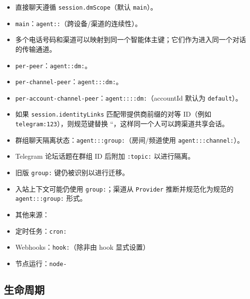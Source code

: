 \begin{itemize}
  \item 直接聊天遵循 \texttt{session.dmScope}（默认 \texttt{main}）。
  \item \texttt{main}：\texttt{agent::}（跨设备/渠道的连续性）。
  \item 多个电话号码和渠道可以映射到同一个智能体主键；它们作为进入同一个对话的传输通道。
  \item \texttt{per-peer}：\texttt{agent::dm:}。
  \item \texttt{per-channel-peer}：\texttt{agent:::dm:}。
  \item \texttt{per-account-channel-peer}：\texttt{agent::::dm:}（accountId 默认为 \texttt{default}）。
  \item 如果 \texttt{session.identityLinks} 匹配带提供商前缀的对等 ID（例如 \texttt{telegram:123}），则规范键替换 ``，这样同一个人可以跨渠道共享会话。
  \item 群组聊天隔离状态：\texttt{agent:::group:}（房间/频道使用 \texttt{agent:::channel:}）。
  \item Telegram 论坛话题在群组 ID 后附加 \texttt{:topic:} 以进行隔离。
  \item 旧版 \texttt{group:} 键仍被识别以进行迁移。
  \item 入站上下文可能仍使用 \texttt{group:}；渠道从 \texttt{Provider} 推断并规范化为规范的 \texttt{agent:::group:} 形式。
  \item 其他来源：
  \item 定时任务：\texttt{cron:}
  \item Webhooks：\texttt{hook:}（除非由 hook 显式设置）
  \item 节点运行：\texttt{node-}
\end{itemize}


\subsection{生命周期}


